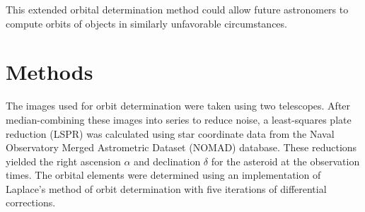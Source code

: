 \documentclass[12pt,journal,compsoc]{IEEEtran}
\begin{document}




This extended orbital determination method could allow future astronomers to
compute orbits of objects in similarly unfavorable circumstances.

\section{Methods}
The images used for orbit determination were taken using two telescopes.
After median-combining these images into series to reduce noise, 
a least-squares plate reduction (LSPR) was calculated
using star coordinate data from the Naval Observatory Merged Astrometric Dataset (NOMAD) database. 
These reductions yielded the right ascension $\alpha$ and declination $\delta$ for the asteroid at the observation times.
The orbital elements were determined using an implementation of Laplace's method of orbit determination 
with five iterations of differential corrections.
\end{document}
